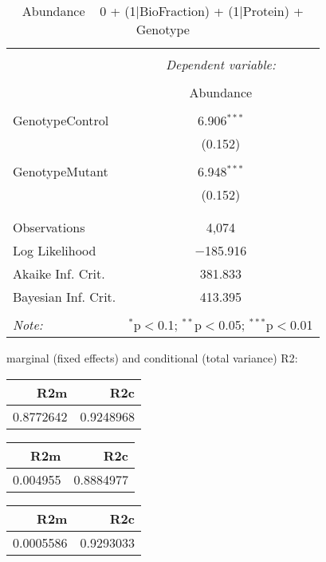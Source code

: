 \documentclass[11pt]{report}
\begin{document}
\begin{table}[!htbp] \centering 
  \caption{Abundance ~ 0 + (1|BioFraction) + (1|Protein) + Genotype} 
  \label{} 
\begin{tabular}{@{\extracolsep{5pt}}lc} 
\\[-1.8ex]\hline 
\hline \\[-1.8ex] 
 & \multicolumn{1}{c}{\textit{Dependent variable:}} \\ 
\cline{2-2} 
\\[-1.8ex] & Abundance \\ 
\hline \\[-1.8ex] 
 GenotypeControl & 6.906$^{***}$ \\ 
  & (0.152) \\ 
  & \\ 
 GenotypeMutant & 6.948$^{***}$ \\ 
  & (0.152) \\ 
  & \\ 
\hline \\[-1.8ex] 
Observations & 4,074 \\ 
Log Likelihood & $-$185.916 \\ 
Akaike Inf. Crit. & 381.833 \\ 
Bayesian Inf. Crit. & 413.395 \\ 
\hline 
\hline \\[-1.8ex] 
\textit{Note:}  & \multicolumn{1}{r}{$^{*}$p$<$0.1; $^{**}$p$<$0.05; $^{***}$p$<$0.01} \\ 
\end{tabular} 
\end{table} 
marginal (fixed effects) and conditional (total variance) R2:

\begin{tabular}{r|r}
\hline
R2m & R2c\\
\hline
0.8772642 & 0.9248968\\
\hline
\end{tabular}

\begin{tabular}{r|r}
\hline
R2m & R2c\\
\hline
0.004955 & 0.8884977\\
\hline
\end{tabular}

\begin{tabular}{r|r}
\hline
R2m & R2c\\
\hline
0.0005586 & 0.9293033\\
\hline
\end{tabular}
\end{document}
